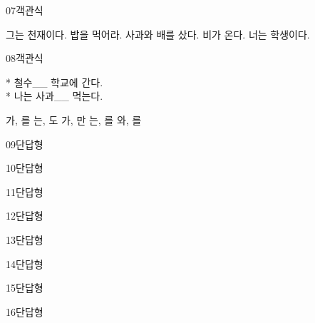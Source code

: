 \documentclass[fs85,seriesRus]{korfarm-base}
\begin{document}
\begin{kfQBlock}{07}{객관식}
\begin{kfChoices}
\kfChoice 그는 천재이다.
\kfChoice 밥을 먹어라.
\kfChoice 사과와 배를 샀다.
\kfChoice 비가 온다.
\kfChoice 너는 학생이다.
\end{kfChoices}
\end{kfQBlock}
\begin{kfQBlock}{08}{객관식}
\begin{kfEvidence}* 철수\_\_ 학교에 간다. \\\relax
* 나는 사과\_\_ 먹는다.\end{kfEvidence}
\begin{kfChoices}
\kfChoice 가, 를
\kfChoice 는, 도
\kfChoice 가, 만
\kfChoice 는, 를
\kfChoice 와, 를
\end{kfChoices}
\end{kfQBlock}
\begin{kfQBlock}{09}{단답형}
\end{kfQBlock}
\begin{kfQBlock}{10}{단답형}
\end{kfQBlock}
\begin{kfQBlock}{11}{단답형}
\end{kfQBlock}
\begin{kfQBlock}{12}{단답형}
\end{kfQBlock}
\begin{kfQBlock}{13}{단답형}
\end{kfQBlock}
\begin{kfQBlock}{14}{단답형}
\end{kfQBlock}
\begin{kfQBlock}{15}{단답형}
\end{kfQBlock}
\begin{kfQBlock}{16}{단답형}
\end{kfQBlock}
\end{document}

